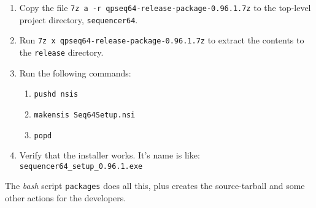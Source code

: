    \begin{enumerate}
      \item Copy the file
         \texttt{7z a -r qpseq64-release-package-0.96.1.7z} to
         the top-level project directory, \texttt{sequencer64}.
      \item Run
         \texttt{7z x qpseq64-release-package-0.96.1.7z} to extract
         the contents to the \texttt{release} directory.
      \item Run the following commands:
         \begin{enumerate}
            \item \texttt{pushd nsis}
            \item \texttt{makensis Seq64Setup.nsi}
            \item \texttt{popd}
         \end{enumerate}
      \item Verify that the installer works.  It's name is like:
         \texttt{sequencer64\_setup\_0.96.1.exe}
   \end{enumerate}

   The \textsl{bash} script \texttt{packages} does all this, plus
   creates the source-tarball and some other actions for the developers.


